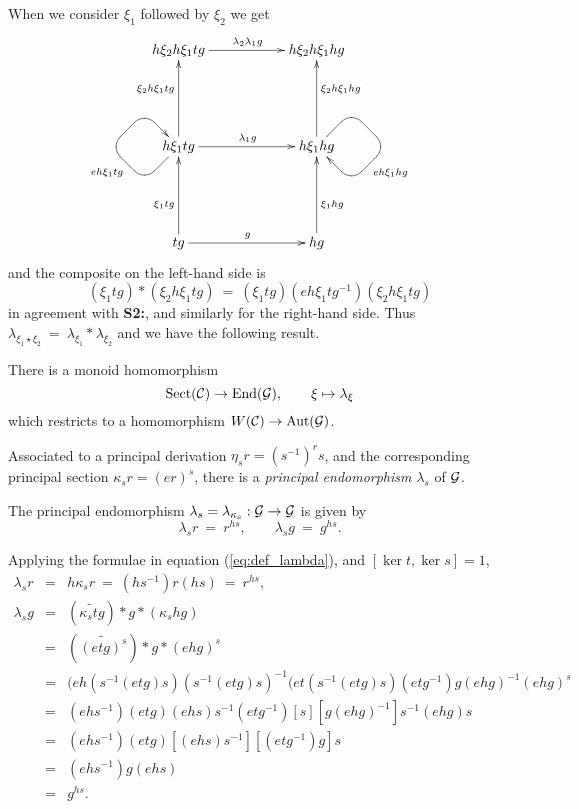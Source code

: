 \bigskip\noindent
When we consider $\xi_1$ followed by $\xi_2$ we get 
$$
\xymatrix{ 
 &  h\xi_2 h\xi_1 tg \ar[rr]^{\lambda_2\lambda_1 g}
    & & h\xi_2 h\xi_1 hg 
        & &  \\
 &  & & & &  \\
 &  h\xi_1 tg \ar[rr]^{\lambda_1 g} \ar[uu]^(0.6){\xi_2 h\xi_1 tg} 
            \ar `dl[0,-1] `[0,-1]^{eh\xi_1tg} `[0,0] [0,0] 
    & & h\xi_1 hg \ar[uu]_(0.6){\xi_2h\xi_1 hg} 
            \ar `ur[0,1] `[0,1] `[0,0]^{eh\xi_1hg} [0,0] 
        & &  \\
 &  & & & &  \\
 &  tg \ar[rr]^{g} \ar[uu]^(0.4){\xi_1 tg}
    & & hg \ar[uu]_(0.4){\xi_1 hg}
        & &
}
$$
and the composite on the left-hand side is 
$$
(\xi_1 tg)*(\xi_2 h\xi_1 tg) ~=~
(\xi_1 tg)(eh\xi_1 tg^{-1})(\xi_2 h\xi_1 tg)
$$
in agreement with {\bf S2:}, 
and similarly for the right-hand side.
Thus $\lambda_{\xi_1\star\xi_2} ~=~ \lambda_{\xi_1} * \lambda_{\xi_2}$  
and we have the following result. 
\begin{lem}
There is a monoid homomorphism 
$$
\mathrm{Sect}(\mathcal{C}) \rightarrow \mathrm{End}(\mathcal{G}), \qquad \xi \mapsto \lambda_{\xi} 
$$
which restricts to a homomorphism $W(\mathcal{C}) \to \mathrm{Aut}(\mathcal{G})$.
\end{lem}

\bigskip\noindent
Associated to a principal derivation $\eta_sr = (s^{-1})^rs$, 
and the corresponding principal section $\kappa_sr = (er)^s$, 
there is a \emph{principal endomorphism}  
$\lambda_s$ of $\mathcal{G}$. 

\begin{prop}
The principal endomorphism $\lambda_s = \lambda_{\kappa_s} : \mathcal{G} \to \mathcal{G}$ 
is given by
$$
\lambda_s r ~=~ r^{hs}, \qquad  \lambda_s g ~=~ g^{hs}.
$$ 
\end{prop}
\begin{pf}
Applying the formulae in equation (\ref{eq:def_lambda}), 
and $[\ker t,\ker s] = 1$,  
\begin{eqnarray*}
\lambda_s r 
  &=& h \kappa_s r ~=~ (hs^{-1})r(hs) ~=~ r^{hs}, \\
\lambda_s g
  &=& (\widetilde{\kappa_stg})*g*(\kappa_shg) \\
  &=& (\widetilde{(etg)^s})*g*(ehg)^s \\
  &=& (eh(s^{-1}(etg)s)(s^{-1}(etg)s)^{-1}(et(s^{-1}(etg)s)(etg^{-1})g(ehg)^{-1}(ehg)^s \\
  &=& (ehs^{-1})(etg)(ehs)s^{-1}(etg^{-1})[s][g(ehg)^{-1}]s^{-1}(ehg)s \\
  &=& (ehs^{-1})(etg)[(ehs)s^{-1}][(etg^{-1})g]s \\
  &=& (ehs^{-1})g(ehs) \\
  &=& g^{hs}. 
\end{eqnarray*}
\end{pf}

